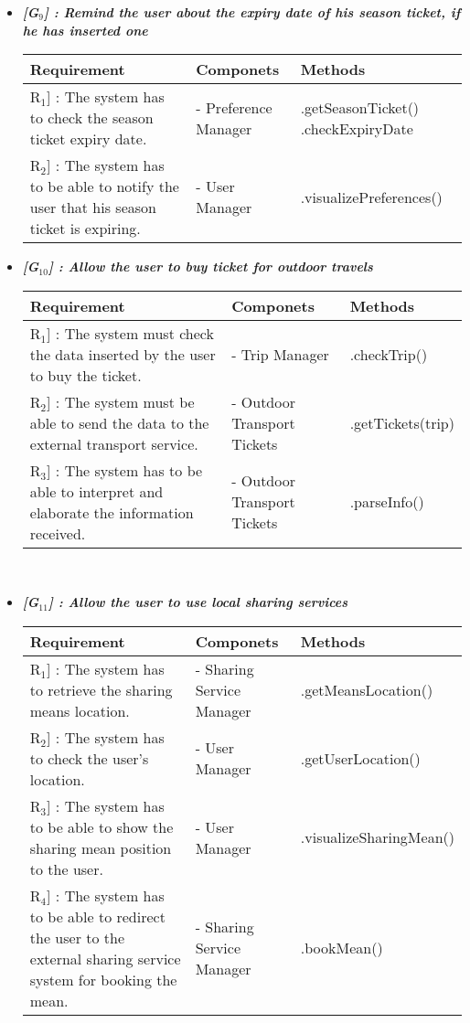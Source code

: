 \begin{itemize}
	\item \emph{\textbf{[G$_{9}$] : Remind the user about the expiry date of his season ticket, if he has inserted one}}
	\vspace{0.4cm}\\
	\begin{tabular}[H]{p{5cm}|p{4cm}|p{4cm}}
		\textbf{Requirement} & \textbf{Componets} & \textbf{Methods}\\
		\hline
		\rule{0pt}{4ex}\lbrack R$_{1}$] : The system has to check the season ticket expiry date. & - Preference Manager & .getSeasonTicket() .checkExpiryDate\\
		\hline
		\rule{0pt}{4ex}\lbrack R$_{2}$] : The system has to be able to notify the user that his season ticket is expiring. & - User Manager & .visualizePreferences()
	\end{tabular}
	
	\newpage
	\item \emph{\textbf{[G$_{10}$] : Allow the user to buy ticket for outdoor travels}}
	\vspace{0.4cm}\\
	\begin{tabular}[H]{p{5cm}|p{4cm}|p{4cm}}
		\textbf{Requirement} & \textbf{Componets} & \textbf{Methods}\\
		\hline
		\rule{0pt}{4ex}\lbrack R$_{1}$] : The system must check the data inserted by the user to buy the ticket. & - Trip Manager & .checkTrip()\\
		\hline
		\rule{0pt}{4ex}\lbrack R$_{2}$] : The system must be able to send the data to the external transport service. & - Outdoor Transport Tickets & .getTickets(trip)\\
		\hline
		\rule{0pt}{4ex}\lbrack R$_{3}$] : The system has to be able to interpret and elaborate the information received. & - Outdoor Transport Tickets & .parseInfo()
	\end{tabular}
	\vspace{0.3cm}\\
	
	\item \emph{\textbf{[G$_{11}$] : Allow the user to use local sharing services}}
	\vspace{0.4cm}\\
	\begin{tabular}[H]{p{5cm}|p{4cm}|p{4cm}}
		\textbf{Requirement} & \textbf{Componets} & \textbf{Methods}\\
		\hline
		\rule{0pt}{4ex}\lbrack R$_{1}$] : The system has to retrieve the sharing means location. & - Sharing Service Manager & .getMeansLocation()\\
		\hline
		\rule{0pt}{4ex}\lbrack R$_{2}$] : The system has to check the user's location. & - User Manager & .getUserLocation()\\
		\hline
		\rule{0pt}{4ex}\lbrack R$_{3}$] : The system has to be able to show the sharing mean position to the user. & - User Manager & .visualizeSharingMean()\\
		\hline
		\rule{0pt}{4ex}\lbrack R$_{4}$] : The system has to be able to redirect the user to the external sharing service system for booking the mean. & - Sharing Service Manager & .bookMean()
	\end{tabular}
	

\end{itemize}
